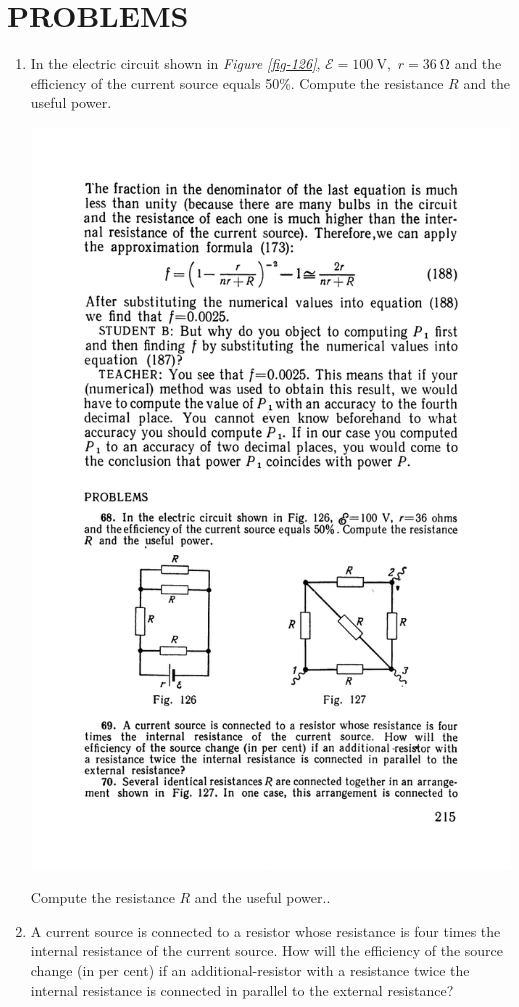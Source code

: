 \documentclass[a4paper,sfsidenotes]{tufte-book}
\newcommand{\Ea}{\mathcal{E}}
\begin{document}
\section{PROBLEMS}
\label{sec-32-1}

\begin{enumerate}[resume=problems]
\item In the electric circuit shown in \emph{Figure \ref{fig-126}}, $\Ea= \SI{100}{\volt},  \,\, r=\SI{36}{\ohm}$
and the efficiency of the current source equals 50\%. Compute the resistance $R$ and the useful power.
\begin{marginfigure}[-2cm]
\centering
\includegraphics[width=.6\linewidth]{fig-126a}
\caption{ Compute the resistance $R$ and the useful power..}
\label{fig-126}
\end{marginfigure}

\item A current source is connected to a resistor whose resistance is four times the internal resistance of the current source. How will the efficiency of the source change (in per cent) if an additional-resistor with a resistance twice the internal resistance is connected in parallel to the external resistance?


\end{enumerate}
\end{document}
